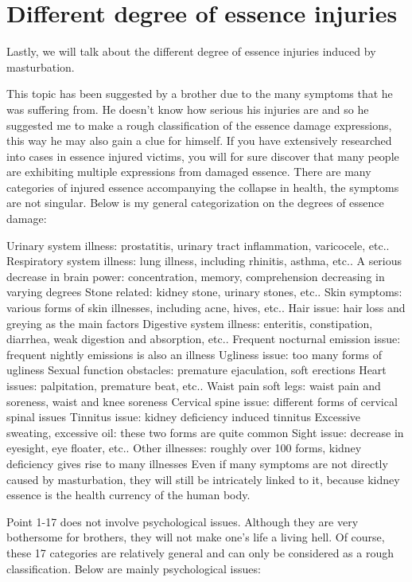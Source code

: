 \documentclass[
]{book}
\begin{document}
\hypertarget{different-degree-of-essence-injuries}{%
\section{Different degree of essence injuries}\label{different-degree-of-essence-injuries}}

Lastly, we will talk about the different degree of essence injuries induced by masturbation.

This topic has been suggested by a brother due to the many symptoms that he was suffering from. He doesn't know how serious his injuries are and so he suggested me to make a rough classification of the essence damage expressions, this way he may also gain a clue for himself. If you have extensively researched into cases in essence injured victims, you will for sure discover that many people are exhibiting multiple expressions from damaged essence. There are many categories of injured essence accompanying the collapse in health, the symptoms are not singular. Below is my general categorization on the degrees of essence damage:

Urinary system illness: prostatitis, urinary tract inflammation, varicocele, etc..
Respiratory system illness: lung illness, including rhinitis, asthma, etc..
A serious decrease in brain power: concentration, memory, comprehension decreasing in varying degrees
Stone related: kidney stone, urinary stones, etc..
Skin symptoms: various forms of skin illnesses, including acne, hives, etc..
Hair issue: hair loss and greying as the main factors
Digestive system illness: enteritis, constipation, diarrhea, weak digestion and absorption, etc..
Frequent nocturnal emission issue: frequent nightly emissions is also an illness
Ugliness issue: too many forms of ugliness
Sexual function obstacles: premature ejaculation, soft erections
Heart issues: palpitation, premature beat, etc..
Waist pain soft legs: waist pain and soreness, waist and knee soreness
Cervical spine issue: different forms of cervical spinal issues
Tinnitus issue: kidney deficiency induced tinnitus
Excessive sweating, excessive oil: these two forms are quite common
Sight issue: decrease in eyesight, eye floater, etc..
Other illnesses: roughly over 100 forms, kidney deficiency gives rise to many illnesses
Even if many symptoms are not directly caused by masturbation, they will still be intricately linked to it, because kidney essence is the health currency of the human body.

Point 1-17 does not involve psychological issues. Although they are very bothersome for brothers, they will not make one's life a living hell. Of course, these 17 categories are relatively general and can only be considered as a rough classification. Below are mainly psychological issues:
\end{document}
